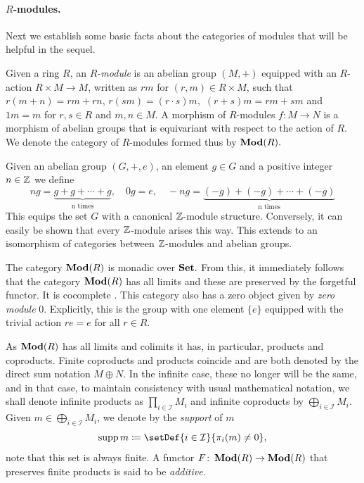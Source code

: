 \documentclass[runningheads]{llncs}
\begin{document}
\paragraph*{$R$-modules.} 
Next we establish some basic facts about the categories of modules that will be helpful in the sequel.
\begin{definition}
  Given a ring $R$, an \emph{$R$-module} is an abelian group $(M, +)$ equipped with an $R$-action $R\times M \to M$, written as $rm$ for $(r, m) \in R \times M$, such that $r(m+n) = rm+rn$, $r(sm) = (r\cdot s)m,$ $(r+s) m = rm +sm$ and $1m = m$ for $r,s \in R$ and $m,n\in M$.
  A morphism of $R$-modules $f \colon M\to N$ is a morphism of abelian groups that is equivariant with respect to the action of $R$. We denote the category of $R$-modules formed thus by $\operatorname{\mathbf{Mod}}(R).$
\end{definition}
\begin{example}
\label{abeliangroups}
Given an abelian group $(G, +, e)$, an element $g \in G$ and a positive integer $n \in \mathbb{Z}$ we define
\begin{equation*}
ng = \underbrace{g + g + \cdots + g}_{\text{n times}}, \quad 0 g = e,   \quad -ng = \underbrace{(-g) + (-g) + \cdots + (-g)}_{\text{n times}}
\end{equation*} 
This equips the set $G$ with a canonical $\mathbb{Z}$-module structure. Conversely, it can easily be shown that every $\mathbb{Z}$-module arises this way. 
This extends to an isomorphism of categories between $\mathbb{Z}$-modules and abelian groups.
\end{example}
The category $\operatorname{\mathbf{Mod}}(R)$ is monadic over $\mathbf{Set}.$
From this, it immediately follows that the category $\operatorname{\mathbf{Mod}}(R)$ has all limits and these are preserved by the forgetful functor. It is cocomplete \cite[Section 2.6]{weibel94}.
This category also has a zero object given by \emph{zero module} $0$. Explicitly, this is the group with one element $\{e\}$ equipped with the trivial action $re = e$ for all $r\in R$.

As $\operatorname{\mathbf{Mod}}(R)$ has all limits and colimits it has, in particular, products and coproducts. Finite coproducts and products coincide and are both denoted by the direct sum notation $M\oplus N$. In the infinite case, these no longer will be the same, and in that case, to maintain consistency with usual mathematical notation, we shall denote infinite products as $\prod_{i\in \mathcal I} M_i$ and infinite coproducts by $\bigoplus_{i \in \mathcal I} M_i$. Given $m \in\bigoplus_{i \in \mathcal I} M_i$, we denote by the \emph{support} of $m$
\begin{equation*}
\operatorname{supp} m \coloneqq \setDef{i \in \mathcal I}{\pi_i(m)\neq 0},
\end{equation*} note that this set is always finite. A functor $F\colon \operatorname{\mathbf{Mod}}(R) \to \operatorname{\mathbf{Mod}}(R)$ that preserves finite products is said to be \emph{additive}.
\end{document}
